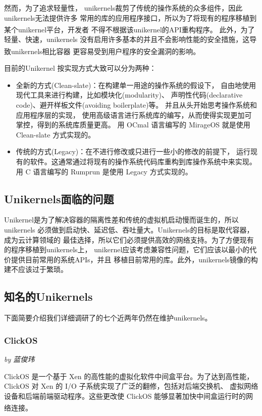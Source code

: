 \documentclass[UTF8,fontset=none,linespread=1.15]{ctexart}
\let\nosupcite\cite
\renewcommand*{\cite}[1]{\textsuperscript{\nosupcite{#1}}}
\newcommand{\sectionauthor}[1]{%
\vspace*{-5ex}
\noindent\textrm{\hfill\textit{by #1}}
\vspace*{2ex}\par}
\begin{document}
然而，为了追求轻量性，
unikernels裁剪了传统的操作系统的众多组件，因此unikernels无法提供许多
常用的库的应用程序接口，所以为了将现有的程序移植到某个unikernel平台，开发者
不得不根据该unikernel的API重构程序。\cite{bib:unikraft}
此外，为了轻量、快速，unikernels
没有启用许多基本的并且不会影响性能的安全措施，这导致unikernels相比容器
更容易受到用户程序的安全漏洞的影响。\cite{bib:unikernel-secuirty}

目前的Unikernel 按实现方式大致可以分为两种：
\begin{itemize}
\item 全新的方式(Clean-slate)：在构建单一用途的操作系统的假设下，
自由地使用现代工具来进行构建，比如模块化(modularity)、
声明性代码(declarative code)、避开样板文件(avoiding boilerplate)等。
并且从头开始思考操作系统和应用程序层的实现，
使用高级语言进行系统库的编写，从而使得实现更加可掌控，得到的系统库质量更高。
用 OCmal 语言编写的 MirageOS 就是使用 Clean-slate 方式实现的。
\item 传统的方式(Legacy)：在不进行修改或只进行一些小的修改的前提下，
运行现有的软件。这通常通过将现有的操作系统代码库重构到库操作系统中来实现。
用 C 语言编写的 Rumprun 是使用 Legacy 方式实现的。
\end{itemize}

\subsection{Unikernels面临的问题}
Unikernel是为了解决容器的隔离性差和传统的虚拟机启动慢而诞生的，所以unikernels
必须做到启动快、延迟低、吞吐量大。Unikernels的目标是取代容器，成为云计算领域的
最佳选择，所以它们必须提供高效的网络支持。为了方便现有的程序移植到unikernels上，
unikernel应该考虑兼容性问题，它们应该以最小的代价提供目前常用的系统APIs，并且
移植目前常用的库。此外，unikernels镜像的构建不应该过于繁琐。

\subsection{知名的Unikernels}\label{subsec:famous-unikernel-projects}
下面简要介绍我们详细调研了的七个近两年仍然在维护unikernels。

\subsubsection{ClickOS}\sectionauthor{蓝俊玮}

ClickOS 是一个基于 Xen 的高性能的虚拟化软件中间盒平台。为了达到高性能，
ClickOS 对 Xen 的 I/O 子系统实现了广泛的翻修，包括对后端交换机、
虚拟网络设备和后端前端驱动程序。这些更改使 ClickOS 能够显著加快中间盒运行时的网络连接。\cite{bib:12-clickos}
\end{document}

